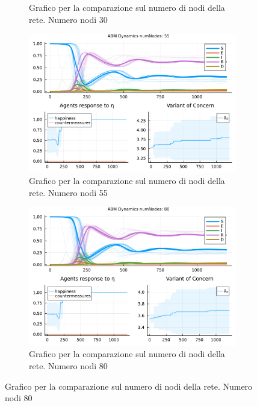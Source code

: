 \begin{figure}[!hb]
\begin{subfigure}[b]{0.45\textwidth}
		\caption{Grafico per la comparazione sul numero di nodi della rete. Numero nodi 30}
		\label{fig:comparison_numberOfNodes_30}
	\end{subfigure}
	\hfill
	\begin{subfigure}[b]{0.45\textwidth}
		\centering
		\includegraphics[width=\textwidth]{img/SocialNetworkABM_3_NN.pdf}
		\caption{Grafico per la comparazione sul numero di nodi della rete. Numero nodi 55}
		\label{fig:comparison_numberOfNodes_55}
	\end{subfigure}
	\hfill
	\begin{subfigure}[b]{0.45\textwidth}
		\centering
		\includegraphics[width=\textwidth]{img/SocialNetworkABM_4_NN.pdf}
		\caption{Grafico per la comparazione sul numero di nodi della rete. Numero nodi 80}
		\label{fig:comparison_numberOfNodes_80}
	\end{subfigure}
\end{figure}
\newpage

